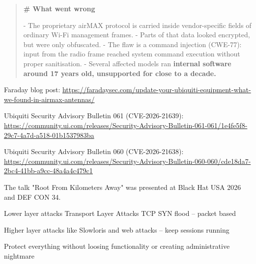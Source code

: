 \documentclass[Screen16to9,17pt]{foils}
\begin{document}
\begin{quote}\small{\bf
\# What went wrong}

- The proprietary airMAX protocol is carried inside vendor-specific fields of ordinary Wi-Fi management frames.
- Parts of that data looked encrypted, but were only obfuscated.
- The flaw is a command injection (CWE-77): input from the radio frame reached system command execution without proper sanitisation.
- Several affected models ran \textbf{internal software around 17 years old, unsupported for close to a decade.}
\end{quote}

\begin{list2}
\item Faraday blog post: \url{https://faradaysec.com/update-your-ubiquiti-equipment-what-we-found-in-airmax-antennas/}
\item Ubiquiti Security Advisory Bulletin 061 (CVE-2026-21639):\\
\url{https://community.ui.com/releases/Security-Advisory-Bulletin-061-061/1e4fe5f8-29c7-4a7d-a518-01b1537983ba}
\item Ubiquiti Security Advisory Bulletin 060 (CVE-2026-21638):\\
 \url{https://community.ui.com/releases/Security-Advisory-Bulletin-060-060/cde18da7-2bc4-41bb-a9cc-48a4a4c479c1}
\item The talk "Root From Kilometers Away" was presented at Black Hat USA 2026 and DEF CON 34.
\end{list2}





\begin{list2}
\item Lower layer attacks Transport Layer Attacks TCP SYN flood -- packet based
\item Higher layer attacks like Slowloris and web attacks -- keep sessions running
\item Protect everything without loosing functionality or creating administrative nightmare
\end{list2}

\end{document}
